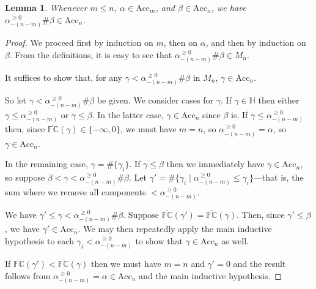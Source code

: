 \documentclass[11pt]{amsart}
\newtheorem{lemma}[theorem]{Lemma}
\theoremstyle{definition}
\begin{document}
\begin{lemma}
  Whenever $m\leq n$, $\alpha\in\mathrm{Acc}_m$, and $\beta\in\mathrm{Acc}_n$, we have $\alpha^{\geq 0}_{-(n-m)}\#\beta\in\mathrm{Acc}_n$.
\end{lemma}
\begin{proof}
  We proceed first by induction on $m$, then on $\alpha$, and then by induction on $\beta$. From the definitions, it is easy to see that $\alpha^{\geq 0}_{-(n-m)}\#\beta\in M_n$.

  It suffices to show that, for any $\gamma<\alpha^{\geq 0}_{-(n-m)}\#\beta$ in $M_n$, $\gamma\in\mathrm{Acc}_n$.

  So let $\gamma<\alpha^{\geq 0}_{-(n-m)}\#\beta$ be given. We consider cases for $\gamma$. If $\gamma\in\mathbb{H}$ then either $\gamma\leq\alpha^{\geq 0}_{-(n-m)}$ or $\gamma\leq\beta$. In the latter case, $\gamma\in\mathrm{Acc}_n$ since $\beta$ is. If $\gamma\leq\alpha^{\geq 0}_{-(n-m)}$ then, since $\overline{\mathbb{FC}}(\gamma)\in\{-\infty,0\}$, we must have $m=n$, so $\alpha^{\geq 0}_{-(n-m)}=\alpha$, so $\gamma\in\mathrm{Acc}_n$.

  In the remaining case, $\gamma=\#\{\gamma_i\}$. If $\gamma\leq\beta$ then we immediately have $\gamma\in\mathrm{Acc}_n$, so suppose $\beta<\gamma<\alpha^{\geq 0}_{-(n-m)}\#\beta$. Let $\gamma'=\#\{\gamma_i\mid \alpha^{\geq 0}_{-(n-m)}\leq\gamma_i\}$---that is, the sum where we remove all components $<\alpha^{\geq 0}_{-(n-m)}$.

  We have $\gamma'\leq\gamma<\alpha^{\geq 0}_{-(n-m)}\#\beta$. Suppose $\overline{\mathbb{FC}}(\gamma')=\overline{\mathbb{FC}}(\gamma)$. Then, since $\gamma'\leq\beta$, we have $\gamma'\in\mathrm{Acc}_n$. We may then repeatedly apply the main inductive hypothesis to each $\gamma_i<\alpha^{\geq 0}_{-(n-m)}$ to show that $\gamma\in\mathrm{Acc}_n$ as well.

  If $\overline{\mathbb{FC}}(\gamma')<\overline{\mathbb{FC}}(\gamma)$ then we must have $m=n$ and $\gamma'=0$ and the result follows from $\alpha^{\geq 0}_{-(n-m)}=\alpha\in\mathrm{Acc}_n$ and the main inductive hypothesis.
\end{proof}
\end{document}
